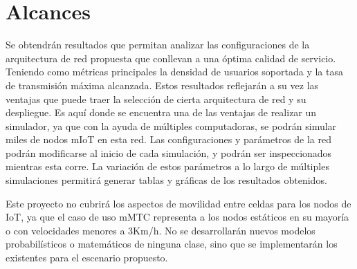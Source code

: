\section{Alcances}

Se obtendrán resultados que permitan analizar las configuraciones de la arquitectura de red propuesta que conllevan a una óptima calidad de servicio. Teniendo como métricas principales la densidad de usuarios soportada y la tasa de transmisión máxima alcanzada. Estos resultados reflejarán a su vez las ventajas que puede traer la selección de cierta arquitectura de red y su despliegue. Es aquí donde se encuentra una de las ventajas de realizar un simulador, ya que con la ayuda de múltiples computadoras, se podrán simular miles de nodos mIoT en esta red. Las configuraciones y parámetros de la red podrán modificarse al inicio de cada simulación, y podrán ser inspeccionados mientras esta corre. La variación de estos parámetros a lo largo de múltiples simulaciones permitirá generar tablas y gráficas de los resultados obtenidos.\newline

Este proyecto no cubrirá los aspectos de movilidad entre celdas para los nodos de IoT, ya que el caso de uso mMTC representa a los nodos estáticos en su mayoría o con velocidades menores a 3Km/h.  No se desarrollarán nuevos modelos probabilísticos o matemáticos de ninguna clase, sino que se implementarán los existentes para el escenario propuesto.\newline
